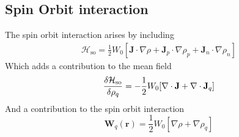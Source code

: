 \subsection{Spin Orbit interaction}
The spin orbit interaction arises by including 
\begin{align}
    \mathcal H_\text{so} = \frac 1 2 W_0[\mathbf J \cdot \nabla \rho + \mathbf J_p \cdot \nabla \rho_p + \mathbf J_n \cdot \nabla \rho_n]
\end{align}
Which adds a contribution to the mean field
\begin{equation}
    \fdv{\mathcal H_\text{so}}{\rho_q} = -\frac 1 2 W_0 [\nabla \cdot \mathbf J + \nabla \cdot \mathbf J_q]
\end{equation}
And a contribution to the spin orbit interaction
\begin{equation}
    \mathbf W_q (\mathbf r ) = \frac 1 2 W_0 [\nabla\rho + \nabla \rho_q]
\end{equation}

